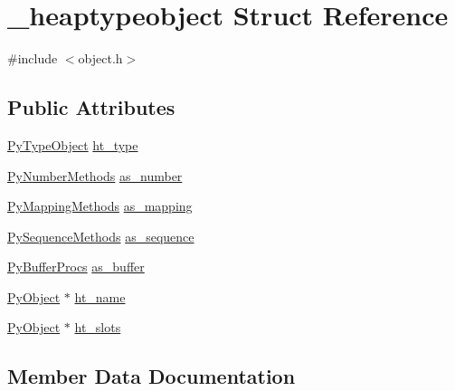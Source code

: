 \hypertarget{struct__heaptypeobject}{}\section{\+\_\+heaptypeobject Struct Reference}
\label{struct__heaptypeobject}


{\ttfamily \#include $<$object.\+h$>$}

\subsection*{Public Attributes}
\begin{DoxyCompactItemize}
\item 
\mbox{\hyperlink{_python27_2object_8h_a42a55dd6e973872c7a6bc61632070f6f}{Py\+Type\+Object}} \mbox{\hyperlink{struct__heaptypeobject_a757f1d6b7f668a05fc6fc641b7a41338}{ht\+\_\+type}}
\item 
\mbox{\hyperlink{struct_py_number_methods}{Py\+Number\+Methods}} \mbox{\hyperlink{struct__heaptypeobject_aaf1b8eff89b976c353ce3c4d949248e2}{as\+\_\+number}}
\item 
\mbox{\hyperlink{struct_py_mapping_methods}{Py\+Mapping\+Methods}} \mbox{\hyperlink{struct__heaptypeobject_aaac5bd975acb4f8964ff2c999adb7310}{as\+\_\+mapping}}
\item 
\mbox{\hyperlink{struct_py_sequence_methods}{Py\+Sequence\+Methods}} \mbox{\hyperlink{struct__heaptypeobject_a5ee56648a9f528df46c03946f99fc4bc}{as\+\_\+sequence}}
\item 
\mbox{\hyperlink{struct_py_buffer_procs}{Py\+Buffer\+Procs}} \mbox{\hyperlink{struct__heaptypeobject_ab1b5548a0e48532173fbd4c3af7fa1a9}{as\+\_\+buffer}}
\item 
\mbox{\hyperlink{_python27_2object_8h_aadc84ac7aed2cfa6f20c25f62bf3dac7}{Py\+Object}} $\ast$ \mbox{\hyperlink{struct__heaptypeobject_a7eef1575c79c30ca3808cc1564b0bacc}{ht\+\_\+name}}
\item 
\mbox{\hyperlink{_python27_2object_8h_aadc84ac7aed2cfa6f20c25f62bf3dac7}{Py\+Object}} $\ast$ \mbox{\hyperlink{struct__heaptypeobject_a576c6533321ab6cb92b6d114d1a5c641}{ht\+\_\+slots}}
\end{DoxyCompactItemize}


\subsection{Member Data Documentation}
\mbox{\label{struct__heaptypeobject_ab1b5548a0e48532173fbd4c3af7fa1a9}} 
